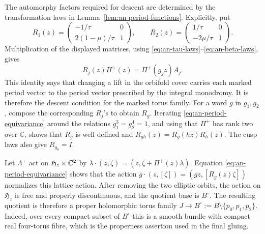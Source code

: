 The automorphy factors required for descent are determined by the
transformation laws in Lemma~\ref{lem:an-period-functions}.  Explicitly, put
\begin{equation*}
 R_1(z)=
 \begin{pmatrix}
 -1/\tau&0\\2(1-\mu)/\tau&1
 \end{pmatrix},
 \qquad
 R_2(z)=
 \begin{pmatrix}
 1/\tau&0\\-2\mu/\tau&1
 \end{pmatrix}.
\end{equation*}
Multiplication of the displayed matrices, using
\eqref{eq:an-tau-laws}--\eqref{eq:an-beta-laws}, gives
\begin{equation}\label{eq:an-period-equivariance}
 R_j(z)\Pi^+(z)=\Pi^+(g_jz)A_j.
\end{equation}
This identity says that changing a lift in the orbifold cover carries each
marked period vector to the period vector prescribed by the integral
monodromy.  It is therefore the descent condition for the marked torus
family.
For a word $g$ in $g_1,g_2$, compose the corresponding $R_j$'s to
obtain $R_g$.  Iterating \eqref{eq:an-period-equivariance} around the
relations $g_1^3=g_2^4=1$, and using that $\Pi^+$ has rank two over
$\mathbb C$, shows that $R_g$ is well defined and
$R_{gh}(z)=R_g(hz)R_h(z)$.  The cusp laws also give $R_{g_0}=I$.

Let $\Lambda^+$ act on $\mathfrak H_z\times\mathbb C^2$ by
$\lambda\cdot(z,\zeta)=(z,\zeta+\Pi^+(z)\lambda)$.
Equation \eqref{eq:an-period-equivariance} shows that the action
$g\cdot(z,[\zeta])=(gz,[R_g(z)\zeta])$
normalizes this lattice action.  After removing the two elliptic orbits, the
action on $\mathfrak H_z$ is free and properly discontinuous, and the
quotient base is $B^\circ$.  The resulting quotient is therefore a proper
holomorphic torus family
$J\to B^\circ:=B\setminus\{p_0,p_1,p_2\}$.
Indeed, over every compact subset of $B^\circ$ this is a smooth bundle
with compact real four-torus fibre, which is the properness assertion used
in the final gluing.

